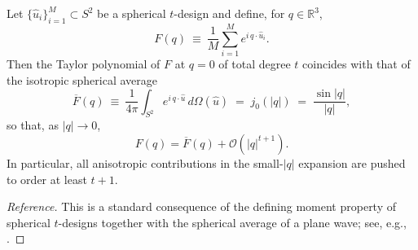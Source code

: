 \begin{proposition}
\label{prop:design_plane_wave_isotropy}
Let $\{\hat u_i\}_{i=1}^M\subset S^2$ be a spherical $t$-design and define, for $q\in\mathbb{R}^3$,
\begin{equation}
    F(q)\ \equiv\ \frac{1}{M}\sum_{i=1}^M e^{i\,q\cdot \hat u_i}.
\end{equation}
Then the Taylor polynomial of $F$ at $q=0$ of total degree $t$ coincides with that of the isotropic spherical average
\begin{equation}
    \overline{F}(q)\ \equiv\ \frac{1}{4\pi}\int_{S^2} e^{i\,q\cdot \hat u}\,d\Omega(\hat u)
    \;=\; j_0(|q|)\;=\;\frac{\sin |q|}{|q|},
\end{equation}
so that, as $|q|\to 0$,
\begin{equation}
    F(q)=\overline{F}(q)+\mathcal{O}(|q|^{t+1}).
\end{equation}
In particular, all anisotropic contributions in the small-$|q|$ expansion are pushed to order at least $t{+}1$.
\end{proposition}
\begin{proof}[Reference]
This is a standard consequence of the defining moment property of spherical $t$-designs together with the spherical average of a plane wave; see, e.g., \cite{DelsarteGoethalsSeidel1977,ArfkenWeberHarris2013}.
\end{proof}

